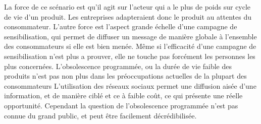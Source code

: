 \medbreak
La force de ce scénario est qu’il agit sur l’acteur qui a le plus de poids sur cycle de vie d’un produit. Les entreprises adapteraient donc le produit au attentes du consommateur. L’autre force est l’aspect grande échelle d’une campagne de sensibilisation, qui permet de diffuser un message de manière globale à l’ensemble des consommateurs si elle est bien menée.
\medbreak
Même si l’efficacité d’une campagne de sensibilisation n’est plus a prouver, elle ne touche pas forcément les personnes les plus concernées. L'obsolescence programmée, ou la durée de vie faible des produits n’est pas non plus dans les préoccupations actuelles de la plupart des consommateurs
\medbreak
L’utilisation des réseaux sociaux permet une diffusion aisée d’une information, et de manière ciblé et ce à faible coût, ce qui présente une réelle opportunité.
\medbreak
Cependant la question de l’obsolescence programmée n’est pas connue du grand public, et peut être facilement décrédibilisée.